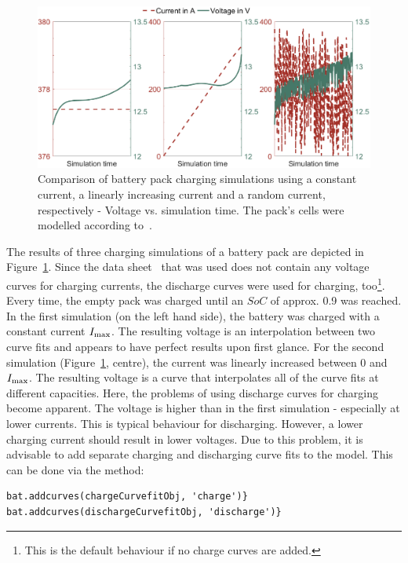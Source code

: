 \begin{figure}[t!]
	\captionsetup{type=figure}
	\centering
	\includegraphics[width=\textwidth]{simulations01}
	\caption[Comparison of battery pack charging simulations using a constant current, a linearly increasing current and a random current, respectively - Voltage vs. simulation time]{Comparison of battery pack charging simulations using a constant current, a linearly increasing current and a random current, respectively - Voltage vs. simulation time. The pack's cells were modelled according to~\cite{_data_2010}.}
	\label{fig:simulations01}
\end{figure}
The results of three charging simulations of a battery pack are depicted in Figure~\ref{fig:simulations01}. Since the data sheet~\cite{_data_2010} that was used does not contain any voltage curves for charging currents, the discharge curves were used for charging, too\footnote{This is the default behaviour if no charge curves are added.}. Every time, the empty pack was charged until an $SoC$ of approx. 0.9 was reached. In the first simulation (on the left hand side), the battery was charged with a constant current $I_\text{max}$. The resulting voltage is an interpolation between two curve fits and appears to have perfect results upon first glance. For the second simulation (Figure~\ref{fig:simulations01}, centre), the current was linearly increased between 0 and $I_\text{max}$. The resulting voltage is a curve that interpolates all of the curve fits at different capacities.  Here, the problems of using discharge curves for charging become apparent. The voltage is higher than in the first simulation - especially at lower currents. This is typical behaviour for discharging. However, a lower charging current should result in lower voltages. Due to this problem, it is advisable to add separate charging and discharging curve fits to the model. This can be done via the  method:
\begin{lstlisting}
bat.addcurves(chargeCurvefitObj, 'charge')}
bat.addcurves(dischargeCurvefitObj, 'discharge')}
\end{lstlisting}
